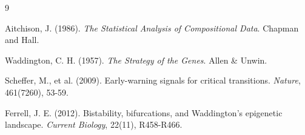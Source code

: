 \documentclass[11pt, a4paper]{article}
\begin{document}
\begin{thebibliography}{9}

Aitchison, J. (1986).
\textit{The Statistical Analysis of Compositional Data}. Chapman and Hall.

Waddington, C. H. (1957).
\textit{The Strategy of the Genes}. Allen \& Unwin.

Scheffer, M., et al. (2009).
Early-warning signals for critical transitions. \textit{Nature}, 461(7260), 53-59.

Ferrell, J. E. (2012).
Bistability, bifurcations, and Waddington's epigenetic landscape. \textit{Current Biology}, 22(11), R458-R466.

\end{thebibliography}
\end{document}
